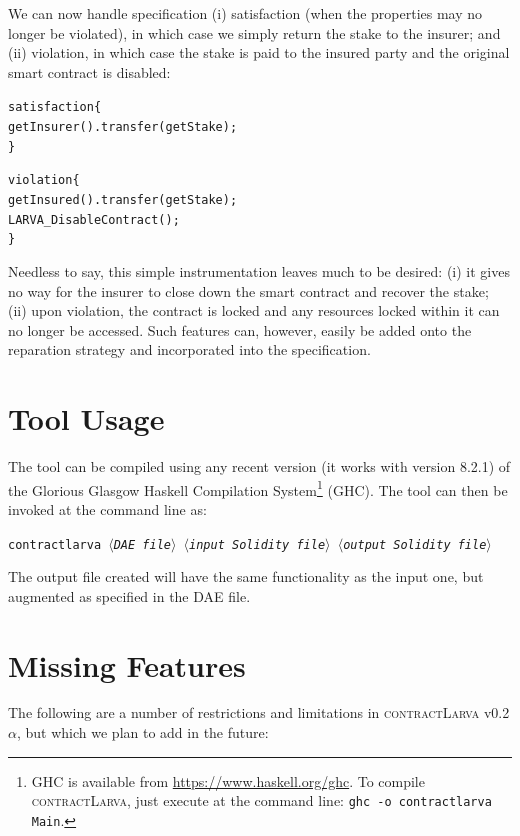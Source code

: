 \documentclass{article}
\newcommand{\contractlarva}{\textsc{contractLarva}\xspace}
\newcommand{\keyword}[1]{\textit{$\langle$#1$\rangle$}}
\begin{document}
    We can now handle specification (i) satisfaction (when the properties may no longer be violated), in which case we simply return the stake to the insurer; and (ii) violation, in which case the stake is paid to the insured party and the original smart contract is disabled:
    
    \small\begin{alltt}
    satisfaction \{
      getInsurer().transfer(getStake);      
    \}

    violation \{
      getInsured().transfer(getStake);
      LARVA\_DisableContract();
    \}
    \end{alltt}\normalsize
  
    Needless to say, this simple instrumentation leaves much to be desired: (i) it gives no way for the insurer to close down the smart contract and recover the stake; (ii) upon violation, the contract is locked and any resources locked within it can no longer be accessed. Such features can, however, easily be added onto the reparation strategy and incorporated into the specification.
    
  \section{Tool Usage}
  The tool can be compiled using any recent version (it works with version 8.2.1) of the Glorious Glasgow Haskell Compilation System\footnote{GHC is available from \url{https://www.haskell.org/ghc}. To compile \contractlarva, just execute at the command line: \texttt{ghc -o contractlarva Main}.} (GHC). The tool can then be invoked at the command line as:
  
  \smallskip\centerline{\texttt{contractlarva \keyword{DAE file} \keyword{input Solidity file} \keyword{output Solidity file}}}
  
  \smallskip The output file created will have the same functionality as the input one, but augmented as specified in the DAE file.
  
  \section{Missing Features}
  \label{s:extensions}
  The following are a number of restrictions and limitations in \contractlarva v0.2$\alpha$, but which we plan to add in the future:
  
\end{document}
